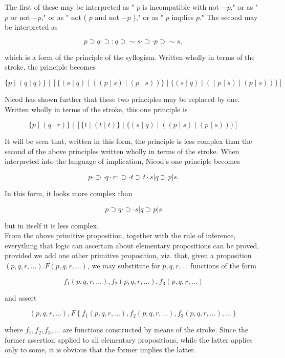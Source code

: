 \documentclass[10pt]{article}
\begin{document}
The first of these may be interpreted as " $p$ is incompatible with not $-p$," or as " $p$ or not $-p$," or as " not ( $p$ and not $-p$ )," or as " $p$ implies $p$." The second may be interpreted as

$$
p \supset q \cdot \supset: q \supset \sim s \cdot \supset \cdot p \supset \sim s,
$$

which is a form of the principle of the syllogism. Written wholly in terms of the stroke, the principle becomes

$$
\{p \mid(q \mid q)\} \mid[\{(s \mid q) \mid((p \mid s) \mid(p \mid s))\} \mid\{(s \mid q) \mid((p \mid s) \mid(p \mid s))\}]
$$

Nicod has shown further that these two principles may be replaced by one. Written wholly in terms of the stroke, this one principle is

$$
\{p \mid(q \mid r)\} \mid[\{t \mid(t \mid t)\} \mid\{(s \mid q) \mid((p \mid s) \mid(p \mid s))\}]
$$

It will be seen that, written in this form, the principle is less complex than the second of the above principles written wholly in terms of the stroke. When interpreted into the language of implication, Nicod's one principle becomes

$$
p \cdot \supset \cdot q \cdot r: \supset \cdot t \supset t \cdot s|q \supset p| s .
$$

In this form, it looks more complex than

$$
p \supset q \cdot \supset \cdot s|q \supset p| s
$$

but in itself it is less complex.\\
From the above primitive proposition, together with the rule of inference, everything that logic can ascertain about elementary propositions can be proved, provided we add one other primitive proposition, viz. that, given a proposition $(p, q, r, \ldots) . F(p, q, r, \ldots)$, we may substitute for $p, q, r, \ldots$ functions of the form

$$
f_{1}(p, q, r, \ldots), f_{2}(p, q, r, \ldots), f_{3}(p, q, r, \ldots)
$$

and assert

$$
(p, q, r, \ldots), F\left\{f_{1}(p, q, r, \ldots), f_{2}(p, q, r, \ldots), f_{3}(p, q, r, \ldots), \ldots\right\}
$$

where $f_{1}, f_{2}, f_{3}, \ldots$ are functions constructed by means of the stroke. Since the former assertion applied to all elementary propositions, while the latter applies only to some, it is obvious that the former implies the latter.
\end{document}
